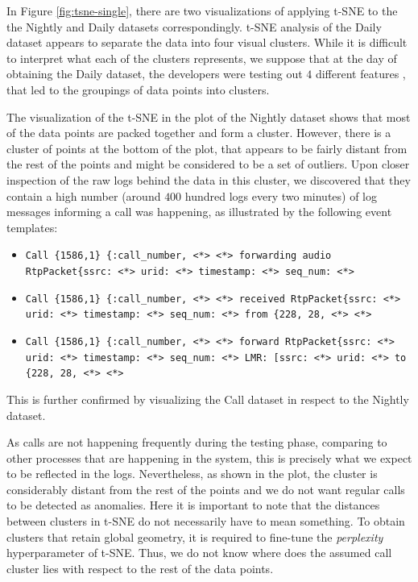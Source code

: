 In Figure \ref{fig:tsne-single}, there are two visualizations of applying t-SNE to the the Nightly and Daily datasets correspondingly. t-SNE analysis of the Daily dataset appears to separate the data into four visual clusters. While it is difficult to interpret what each of the clusters represents, we suppose that at the day of obtaining the Daily dataset, the developers were testing out $4$ different features , that led to the groupings of data points into clusters.

The visualization of the t-SNE in the plot of the Nightly dataset shows that most of the data points are packed together and form a cluster. However, there is a cluster of points at the bottom of the plot, that appears to be fairly distant from the rest of the points and might be considered to be a set of outliers. Upon closer inspection of the raw logs behind the data in this cluster, we discovered that they contain a high number (around $400$ hundred logs every two minutes) of log messages informing a call was happening, as illustrated by the following event templates:

\begin{itemize}
    \item \texttt{\justify Call \{1586,1\} \{:call\_number, <*> <*> forwarding audio RtpPacket\{ssrc: <*> urid: <*> timestamp: <*> seq\_num: <*>}
    \item \texttt{\justify Call \{1586,1\} \{:call\_number, <*> <*> received RtpPacket\{ssrc: <*> urid: <*> timestamp: <*> seq\_num: <*> from \{228, 28, <*> <*>}
    \item \texttt{\justify Call \{1586,1\} \{:call\_number, <*> <*> forward RtpPacket\{ssrc: <*> urid: <*> timestamp: <*> seq\_num: <*> LMR: [ssrc: <*> urid: <*> to \{228, 28, <*> <*>}
\end{itemize}

This is further confirmed by visualizing the Call dataset in respect to the Nightly dataset.

As calls are not happening frequently during the testing phase, comparing to other processes that are happening in the system, this is precisely what we expect to be reflected in the logs. Nevertheless, as shown in the plot, the cluster is considerably distant from the rest of the points and we do not want regular calls to be detected as anomalies. Here it is important to note that the distances between clusters in t-SNE do not 
necessarily have to mean something. To obtain clusters that retain global geometry, it is required to fine-tune the \textit{perplexity} hyperparameter of t-SNE. Thus, we do not know where does the assumed call cluster lies with respect to the rest of the data points.


